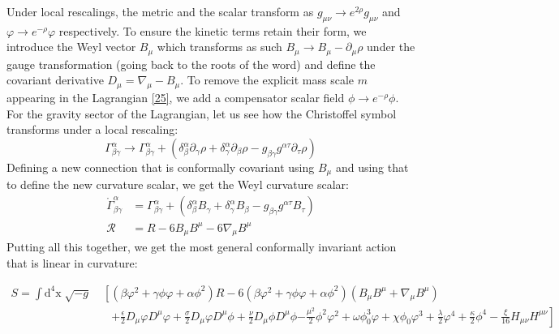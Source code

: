 \documentclass[aps,prd,reprint,preprintnumbers,showpacs,floatfix,nofootinbib,superscript address]{revtex4-2}
\begin{document}
Under local rescalings, the metric and the scalar transform as $g_{\mu\nu} \rightarrow e^{2\rho} g_{\mu\nu} $ and  $\varphi \rightarrow e^{-\rho}\varphi$ respectively. To ensure the kinetic terms retain their form, we introduce the Weyl vector $B_\mu$ which transforms as such $B_{\mu} \rightarrow B_\mu - \partial_\mu \rho$ under the gauge transformation (going back to the roots of the word) and define the covariant derivative $D_\mu = \nabla_\mu - B_\mu$. To remove the explicit mass scale $m$ appearing in the Lagrangian \ref{25}, we add a compensator scalar field $\phi \rightarrow e^{-\rho}\phi$. For the gravity sector of the Lagrangian, let us see how the Christoffel symbol transforms under a local rescaling:
\begin{equation}
    \Gamma^{\alpha}_{\beta \gamma} \rightarrow \Gamma^{\alpha}_{\beta \gamma} +(\delta^{\alpha}_{\beta} \partial_\gamma \rho + \delta^{\alpha}_{\gamma} \partial_{\beta} \rho - g_{\beta \gamma}g^{\alpha \tau}\partial_{\tau}\rho)
\end{equation}
Defining a new connection that is conformally covariant using $B_\mu$ and using that to define the new curvature scalar, we get the Weyl curvature scalar:
\begin{align}
    \mathring{\Gamma}^{\alpha}_{\beta \gamma} &= \Gamma^{\alpha}_{\beta \gamma} + (\delta^{\alpha}_{\beta} B_{\gamma} + \delta^{\alpha}_{\gamma} B_{\beta} - g_{\beta \gamma}g^{\alpha \tau}B_{\tau}) \nonumber \\
    \mathcal{R} &= R - 6 B_{\mu} B^{\mu} - 6 \nabla_\mu B^\mu
\end{align}
Putting all this together, we get the most general conformally invariant action that is linear in curvature:
\begin{widetext} 
\begin{subequations} \label{32a}
\begin{align}
    S =\int \text{d}^4\text{x} \; \sqrt{-g} &\; \left[ ( \beta \varphi^2 + \gamma \phi \varphi +\alpha \phi^2) R - 6( \beta \varphi^2 + \gamma \phi \varphi +\alpha \phi^2) (B_{\mu} B^{\mu} + \nabla_\mu B^\mu) \right. \nonumber \\
    &\quad \left. +\frac{\epsilon}{2} D_{\mu}\varphi D^{\mu}\varphi + \frac{\sigma}{2} D_{\mu}\varphi D^{\mu}\phi + \frac{\nu}{2} D_{\mu}\phi D^{\mu}\phi \right. \left. - \frac{\mu^2}{2} \phi^2 \varphi^2 + \omega \phi_0^3 \varphi + \chi \phi_0 \varphi^3 + \frac{\lambda}{2} \varphi^4 + \frac{\kappa}{2} \phi^4 - \frac{\xi}{16} H_{\mu\nu}H^{\mu\nu} \right]  
\end{align}
\end{subequations}
\end{widetext}
\end{document}
